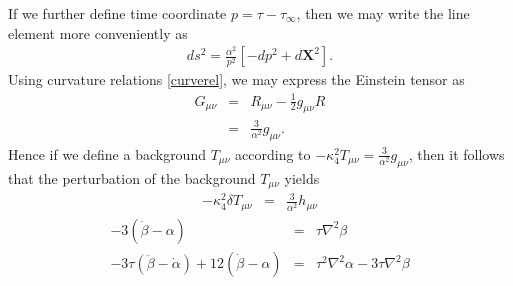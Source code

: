 \documentclass[10pt,letterpaper]{article}
\begin{document}
If we further define time coordinate $p = \tau-\tau_{\infty}$, then we may write the line element more conveniently as
\begin{eqnarray}
ds^2 = \frac{\alpha^2}{p^2}\left[ -dp^2 + d\mathbf X^2 \right].
\end{eqnarray}
Using curvature relations \eqref{curverel}, we may express the Einstein tensor as 
\begin{eqnarray}
G_{\mu\nu} &=& R_{\mu\nu} - \frac{1}{2}g_{\mu\nu} R
\nonumber\\
&=& \frac{3}{\alpha^2}g_{\mu\nu}.
\end{eqnarray}
Hence if we define a background $T_{\mu\nu}$ according to $-\kappa^2_4 T_{\mu\nu} =\frac{3}{\alpha^2} g_{\mu\nu}$, then it follows that the perturbation of the background $T_{\mu\nu}$ yields
\begin{eqnarray}
-\kappa^2_4\delta T_{\mu\nu} &=& \frac{3}{\alpha^2} h_{\mu\nu}
\end{eqnarray}
\begin{eqnarray}
-3(\dot\beta -\alpha) &=& \tau \nabla^2 \beta
\nonumber\\
-3\tau (\ddot \beta - \dot\alpha) + 12(\dot\beta-\alpha) &=& \tau^2 \nabla^2\alpha - 3\tau \nabla^2\beta
\end{eqnarray}
\end{document}
